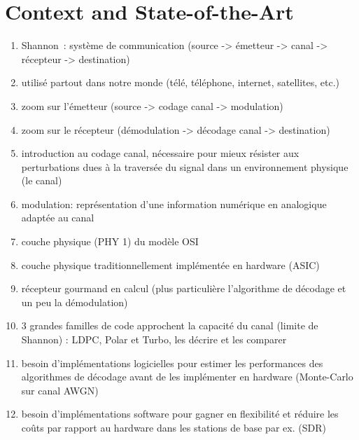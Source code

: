 \chapter{Context and State-of-the-Art}

\begin{enumerate}
  \item Shannon~\cite{Shannon1948}: système de communication (source -> émetteur
        -> canal -> récepteur -> destination)
  \item utilisé partout dans notre monde (télé, téléphone, internet, satellites,
        etc.)
  \item zoom sur l'émetteur (source -> codage canal -> modulation)
  \item zoom sur le récepteur (démodulation -> décodage canal -> destination)
  \item introduction au codage canal, nécessaire pour mieux résister aux
        perturbations dues à la traversée du signal dans un environnement
        physique (le canal)
  \item modulation: représentation d'une information numérique en analogique
        adaptée au canal
  \item couche physique (PHY 1) du modèle OSI
  \item couche physique traditionnellement implémentée en hardware (ASIC)
  \item récepteur gourmand en calcul (plus particulière l'algorithme de décodage
        et un peu la démodulation)
  \item 3 grandes familles de code approchent la capacité du canal (limite de
        Shannon) : LDPC, Polar et Turbo, les décrire et les comparer
  \item besoin d'implémentations logicielles pour estimer les performances des
        algorithmes de décodage avant de les implémenter en hardware
        (Monte-Carlo sur canal AWGN)
  \item besoin d'implémentations software pour gagner en flexibilité et réduire
        les coûts par rapport au hardware dans les stations de base par ex.
        (SDR)
\end{enumerate}